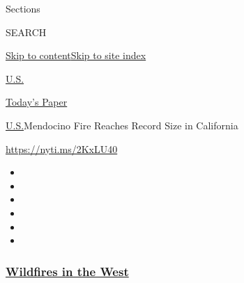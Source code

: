 Sections

SEARCH

\protect\hyperlink{site-content}{Skip to
content}\protect\hyperlink{site-index}{Skip to site index}

\href{https://www.nytimes3xbfgragh.onion/section/us}{U.S.}

\href{https://myaccount.nytimes3xbfgragh.onion/auth/login?response_type=cookie\&client_id=vi}{}

\href{https://www.nytimes3xbfgragh.onion/section/todayspaper}{Today's
Paper}

\href{/section/us}{U.S.}\textbar{}Mendocino Fire Reaches Record Size in
California

\url{https://nyti.ms/2KxLU40}

\begin{itemize}
\item
\item
\item
\item
\item
\item
\end{itemize}

\hypertarget{wildfires-in-the-west}{%
\subsubsection{\texorpdfstring{\href{https://www.nytimes3xbfgragh.onion/spotlight/california-wildfires?name=styln-california-wildfires\&region=TOP_BANNER\&block=storyline_menu_recirc\&action=click\&pgtype=Article\&impression_id=cb5d8830-f2ad-11ea-9b15-cd32a6585360\&variant=undefined}{Wildfires
in the West}}{Wildfires in the West}}\label{wildfires-in-the-west}}

